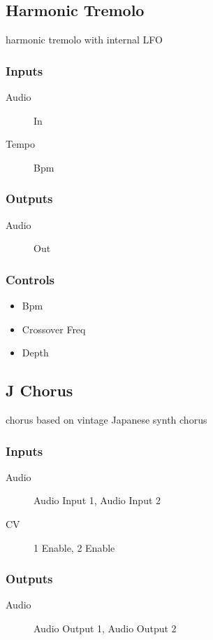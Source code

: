 \subsection{Harmonic Tremolo}

harmonic tremolo with internal LFO



\subsubsection{Inputs}
\begin{description}
\item [Audio] In
\item [Tempo] Bpm
\end{description}

\subsubsection{Outputs}
\begin{description}
\item [Audio] Out
\end{description}

\subsubsection{Controls}
\begin{itemize}
\item Bpm
\item Crossover Freq
\item Depth
\end{itemize}

\subsection{J Chorus}

chorus based on vintage Japanese synth chorus



\subsubsection{Inputs}
\begin{description}
\item [Audio] Audio Input 1, Audio Input 2
\item [CV] 1 Enable, 2 Enable
\end{description}

\subsubsection{Outputs}
\begin{description}
\item [Audio] Audio Output 1, Audio Output 2
\end{description}

